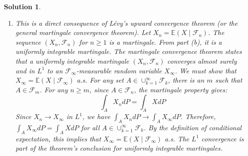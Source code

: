 \documentclass[12pt]{amsart}
\newtheorem*{solution}{Solution}
\begin{document}
\begin{solution}
\begin{enumerate}[label=(\alph*)]
\item This is a direct consequence of Lévy's upward convergence theorem (or the general martingale convergence theorem).
Let $X_n = \mathbb{E}(X \mid \mathcal{F}_n)$. The sequence $(X_n, \mathcal{F}_n)$ for $n \ge 1$ is a martingale. From part (b), it is a uniformly integrable martingale.
The martingale convergence theorem states that a uniformly integrable martingale $(X_n, \mathcal{F}_n)$ converges almost surely and in $L^1$ to an $\mathcal{F}_\infty$-measurable random variable $X_\infty$.
We must show that $X_\infty = \mathbb{E}(X \mid \mathcal{F}_\infty)$ a.s.
For any set $A \in \cup_{k=1}^\infty \mathcal{F}_k$, there is an $m$ such that $A \in \mathcal{F}_m$. For any $n \ge m$, since $A \in \mathcal{F}_n$, the martingale property gives:
$$ \int_A X_n dP = \int_A X dP $$
Since $X_n \to X_\infty$ in $L^1$, we have $\int_A X_n dP \to \int_A X_\infty dP$.
Therefore, $\int_A X_\infty dP = \int_A X dP$ for all $A \in \cup_{k=1}^\infty \mathcal{F}_k$.
By the definition of conditional expectation, this implies that $X_\infty = \mathbb{E}(X \mid \mathcal{F}_\infty)$ a.s. The $L^1$ convergence is part of the theorem's conclusion for uniformly integrable martingales.
\end{enumerate}
\end{solution}
\end{document}
